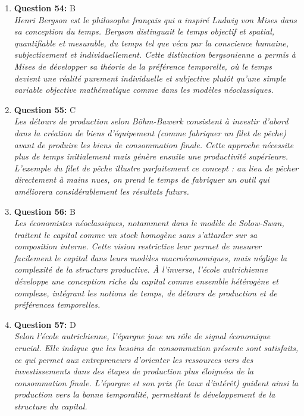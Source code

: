 \documentclass[12pt,a4paper]{article}
\begin{document}
\begin{enumerate}
\item \textbf{Question 54:} B
\\ \textit{Henri Bergson est le philosophe français qui a inspiré Ludwig von Mises dans sa conception du temps. Bergson distinguait le temps objectif et spatial, quantifiable et mesurable, du temps tel que vécu par la conscience humaine, subjectivement et individuellement. Cette distinction bergsonienne a permis à Mises de développer sa théorie de la préférence temporelle, où le temps devient une réalité purement individuelle et subjective plutôt qu'une simple variable objective mathématique comme dans les modèles néoclassiques.}

\item \textbf{Question 55:} C
\\ \textit{Les détours de production selon Böhm-Bawerk consistent à investir d'abord dans la création de biens d'équipement (comme fabriquer un filet de pêche) avant de produire les biens de consommation finale. Cette approche nécessite plus de temps initialement mais génère ensuite une productivité supérieure. L'exemple du filet de pêche illustre parfaitement ce concept : au lieu de pêcher directement à mains nues, on prend le temps de fabriquer un outil qui améliorera considérablement les résultats futurs.}

\item \textbf{Question 56:} B
\\ \textit{Les économistes néoclassiques, notamment dans le modèle de Solow-Swan, traitent le capital comme un stock homogène sans s'attarder sur sa composition interne. Cette vision restrictive leur permet de mesurer facilement le capital dans leurs modèles macroéconomiques, mais néglige la complexité de la structure productive. À l'inverse, l'école autrichienne développe une conception riche du capital comme ensemble hétérogène et complexe, intégrant les notions de temps, de détours de production et de préférences temporelles.}

\item \textbf{Question 57:} D
\\ \textit{Selon l'école autrichienne, l'épargne joue un rôle de signal économique crucial. Elle indique que les besoins de consommation présente sont satisfaits, ce qui permet aux entrepreneurs d'orienter les ressources vers des investissements dans des étapes de production plus éloignées de la consommation finale. L'épargne et son prix (le taux d'intérêt) guident ainsi la production vers la bonne temporalité, permettant le développement de la structure du capital.}


\end{enumerate}
\end{document}
